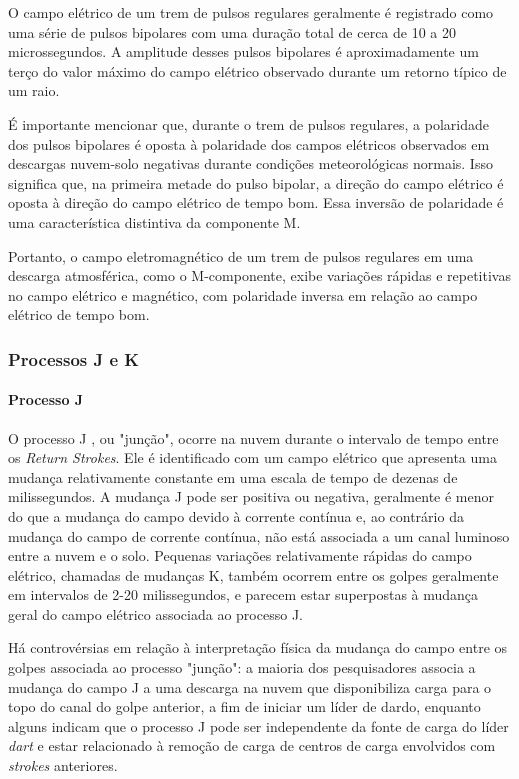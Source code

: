\documentclass[a4paper, 12pt, onecolumn,singlespacing]{article}
\begin{document}
		O campo elétrico de um trem de pulsos regulares geralmente é registrado como uma série de pulsos bipolares com uma duração total de cerca de 10 a 20 microssegundos. A amplitude desses pulsos bipolares é aproximadamente um terço do valor máximo do campo elétrico observado durante um retorno típico de um raio.
		
		É importante mencionar que, durante o trem de pulsos regulares, a polaridade dos pulsos bipolares é oposta à polaridade dos campos elétricos observados em descargas nuvem-solo negativas durante condições meteorológicas normais. Isso significa que, na primeira metade do pulso bipolar, a direção do campo elétrico é oposta à direção do campo elétrico de tempo bom. Essa inversão de polaridade é uma característica distintiva da componente M.
		
		Portanto, o campo eletromagnético de um trem de pulsos regulares em uma descarga atmosférica, como o M-componente, exibe variações rápidas e repetitivas no campo elétrico e magnético, com polaridade inversa em relação ao campo elétrico de tempo bom.


	\subsubsection{Processos J e K}
	
		\paragraph{Processo J} O processo J \cite{UHMAN_1987}, ou "junção", ocorre na nuvem durante o intervalo de tempo entre os \textit{Return Strokes}. Ele é identificado com um campo elétrico que apresenta uma mudança relativamente constante em uma escala de tempo de dezenas de milissegundos. A mudança J pode ser positiva ou negativa, geralmente é menor do que a mudança do campo devido à corrente contínua e, ao contrário da mudança do campo de corrente contínua, não está associada a um canal luminoso entre a nuvem e o solo. Pequenas variações relativamente rápidas do campo elétrico, chamadas de mudanças K, também ocorrem entre os golpes geralmente em intervalos de 2-20 milissegundos, e parecem estar superpostas à mudança geral do campo elétrico associada ao processo J.
		
		Há controvérsias em relação à interpretação física da mudança do campo entre os golpes associada ao processo "junção": a maioria dos pesquisadores associa a mudança do campo J a uma descarga na nuvem que disponibiliza carga para o topo do canal do golpe anterior, a fim de iniciar um líder de dardo, enquanto alguns indicam que o processo J pode ser independente da fonte de carga do líder \textit{dart} e estar relacionado à remoção de carga de centros de carga envolvidos com \textit{strokes} anteriores.
		
\end{document}
